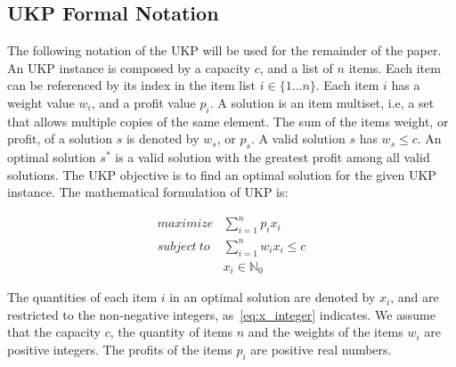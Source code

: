 \documentclass[runningheads,a4paper]{llncs}
\begin{document}


\subsection{UKP Formal Notation}

The following notation of the UKP will be used for the remainder of the paper. An UKP instance is composed by a capacity \(c\), and a list of \(n\) items.
Each item can be referenced by its index in the item list \(i \in \{1\dots n\}\). 
Each item \(i\) has a weight value \(w_i\), and a profit value \(p_i\).
A solution is an item multiset, i.e, a set that allows multiple copies of the same element.
The sum of the items weight, or profit, of a solution \(s\) is denoted by \(w_s\), or \(p_s\).
A valid solution \(s\) has \(w_s \leq c\).
An optimal solution \(s^*\) is a valid solution with the greatest profit among all valid solutions.
The UKP objective is to find an optimal solution for the given UKP instance. 
The mathematical formulation of UKP is:

\begin{align}
  maximize &\sum_{i=1}^n p_i x_i\label{eq:objfun}\\
subject~to &\sum_{i=1}^n w_i x_i \leq c\label{eq:capcons}\\
            &x_i \in \mathbb{N}_0\label{eq:x_integer}
\end{align}

The quantities of each item \(i\) in an optimal solution are denoted by \(x_i\), and are restricted to the non-negative integers, as~\eqref{eq:x_integer} indicates. 
We assume that the capacity \(c\), the quantity of items \(n\) and the weights of the items \(w_i\) are positive integers. 
The profits of the items \(p_i\) are positive real numbers.
\end{document}
